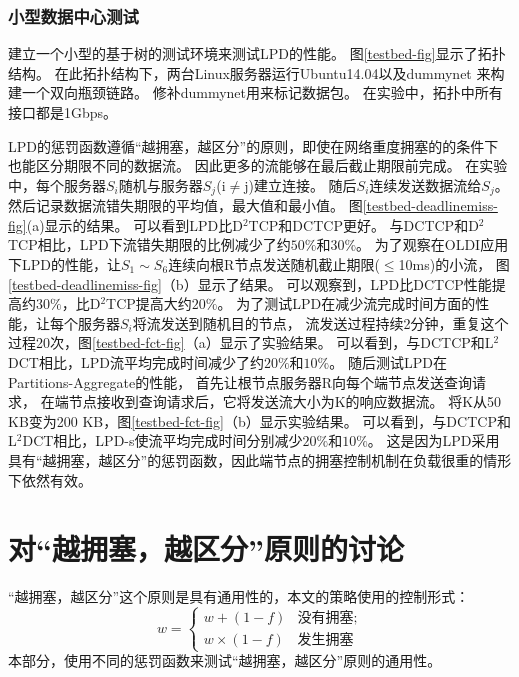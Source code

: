 \subsubsection{小型数据中心测试}
建立一个小型的基于树的测试环境来测试LPD的性能。
图\ref{testbed-fig}显示了拓扑结构。
在此拓扑结构下，两台Linux服务器运行Ubuntu14.04以及dummynet \cite{dummynet,MPTCP} 来构建一个双向瓶颈链路。
修补dummynet用来标记数据包。
在实验中，拓扑中所有接口都是1Gbps。


LPD的惩罚函数遵循“越拥塞，越区分”的原则，即使在网络重度拥塞的的条件下也能区分期限不同的数据流。
因此更多的流能够在最后截止期限前完成。
在实验中，每个服务器$S_i$随机与服务器$S_j$(i$\neq$j)建立连接。
随后$S_i$连续发送数据流给$S_j$。
然后记录数据流错失期限的平均值，最大值和最小值。
图\ref{testbed-deadlinemiss-fig}(a)显示的结果。
可以看到LPD比D$^2$TCP和DCTCP更好。
与DCTCP和D$^2$TCP相比，LPD下流错失期限的比例减少了约$50\%$和$30\%$。
为了观察在OLDI应用下LPD的性能，让$S_1\sim S_6$连续向根R节点发送随机截止期限($\le$10ms)的小流，
图\ref{testbed-deadlinemiss-fig}（b）显示了结果。
可以观察到，LPD比DCTCP性能提高约$30\%$，比D$^2$TCP提高大约$20\%$。
为了测试LPD在减少流完成时间方面的性能，让每个服务器$S_i$将流发送到随机目的节点，
流发送过程持续2分钟，重复这个过程20次，图\ref{testbed-fct-fig}（a）显示了实验结果。
可以看到，与DCTCP和L$^2$DCT相比，LPD流平均完成时间减少了约$20\%$和$10\%$。
随后测试LPD在Partitions-Aggregate的性能，
首先让根节点服务器R向每个端节点发送查询请求，
在端节点接收到查询请求后，它将发送流大小为K的响应数据流。
将K从50 KB变为200 KB，图\ref{testbed-fct-fig}（b）显示实验结果。
可以看到，与DCTCP和L$^2$DCT相比，LPD-s使流平均完成时间分别减少$20\%$和$10\%$。
这是因为LPD采用具有“越拥塞，越区分”的惩罚函数，因此端节点的拥塞控制机制在负载很重的情形下依然有效。

\section{对“越拥塞，越区分”原则的讨论}
 “越拥塞，越区分”这个原则是具有通用性的，本文的策略使用的控制形式：
\begin{equation}
w=
\begin{cases}
w+(1-f) &\text{没有拥塞;}\\
w \times (1-f) &\text{发生拥塞}
\end{cases}\nonumber
\end{equation}
本部分，使用不同的惩罚函数来测试“越拥塞，越区分”原则的通用性。
